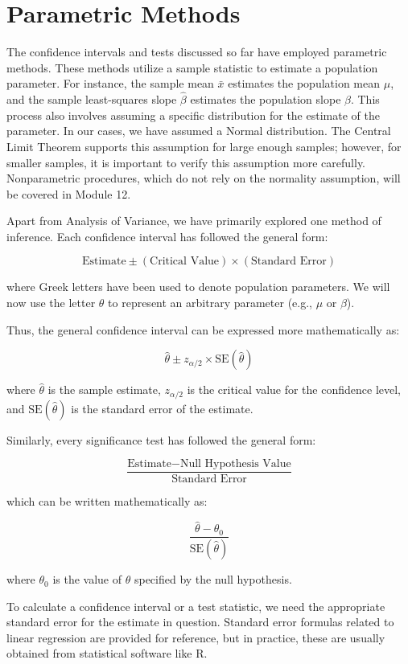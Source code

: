 \documentclass{article}
\begin{document}
\section*{Parametric Methods}

The confidence intervals and tests discussed so far have employed parametric methods. These methods utilize a sample statistic to estimate a population parameter. For instance, the sample mean \(\bar{x}\) estimates the population mean \(\mu\), and the sample least-squares slope \(\hat{\beta}\) estimates the population slope \(\beta\). This process also involves assuming a specific distribution for the estimate of the parameter. In our cases, we have assumed a Normal distribution. The Central Limit Theorem supports this assumption for large enough samples; however, for smaller samples, it is important to verify this assumption more carefully. Nonparametric procedures, which do not rely on the normality assumption, will be covered in Module 12.

Apart from Analysis of Variance, we have primarily explored one method of inference. Each confidence interval has followed the general form:

\[
\text{Estimate} \pm (\text{Critical Value}) \times (\text{Standard Error})
\]

where Greek letters have been used to denote population parameters. We will now use the letter \(\theta\) to represent an arbitrary parameter (e.g., \(\mu\) or \(\beta\)).

Thus, the general confidence interval can be expressed more mathematically as:

\[
\hat{\theta} \pm z_{\alpha/2} \times \text{SE}(\hat{\theta})
\]

where \(\hat{\theta}\) is the sample estimate, \(z_{\alpha/2}\) is the critical value for the confidence level, and \(\text{SE}(\hat{\theta})\) is the standard error of the estimate.

Similarly, every significance test has followed the general form:

\[
\frac{\text{Estimate} - \text{Null Hypothesis Value}}{\text{Standard Error}}
\]

which can be written mathematically as:

\[
\frac{\hat{\theta} - \theta_0}{\text{SE}(\hat{\theta})}
\]

where \(\theta_0\) is the value of \(\theta\) specified by the null hypothesis.

To calculate a confidence interval or a test statistic, we need the appropriate standard error for the estimate in question. Standard error formulas related to linear regression are provided for reference, but in practice, these are usually obtained from statistical software like R.
\end{document}
